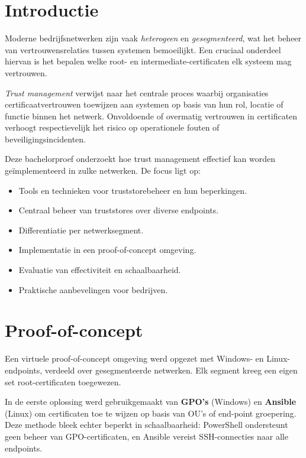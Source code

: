 \documentclass[a0,portrait]{hogent-poster}
\begin{document}
\begin{multicols}{2} %

\section{Introductie}

Moderne bedrijfsnetwerken zijn vaak \textit{heterogeen} en \textit{gesegmenteerd}, wat het beheer van vertrouwensrelaties tussen systemen bemoeilijkt. Een cruciaal onderdeel hiervan is het bepalen welke root- en intermediate-certificaten elk systeem mag vertrouwen.

\textit{Trust management} verwijst naar het centrale proces waarbij organisaties certificaatvertrouwen toewijzen aan systemen op basis van hun rol, locatie of functie binnen het netwerk. Onvoldoende of overmatig vertrouwen in certificaten verhoogt respectievelijk het risico op operationele fouten of beveiligingsincidenten.

Deze bachelorproef onderzoekt hoe trust management effectief kan worden geïmplementeerd in zulke netwerken. De focus ligt op:

\begin{itemize}
    \item Tools en technieken voor truststorebeheer en hun beperkingen.
    \item Centraal beheer van truststores over diverse endpoints.
    \item Differentiatie per netwerksegment.
    \item Implementatie in een proof-of-concept omgeving.
    \item Evaluatie van effectiviteit en schaalbaarheid.
    \item Praktische aanbevelingen voor bedrijven.
\end{itemize}


\section{Proof-of-concept}

Een virtuele proof-of-concept omgeving werd opgezet met Windows- en Linux-endpoints, verdeeld over gesegmenteerde netwerken. Elk segment kreeg een eigen set root-certificaten toegewezen.

In de eerste oplossing werd gebruikgemaakt van \textbf{GPO’s} (Windows) en \textbf{Ansible} (Linux) om certificaten toe te wijzen op basis van OU’s of end-point groepering. Deze methode bleek echter beperkt in schaalbaarheid: PowerShell ondersteunt geen beheer van GPO-certificaten, en Ansible vereist SSH-connecties naar alle endpoints.


\end{multicols}
\end{document}

